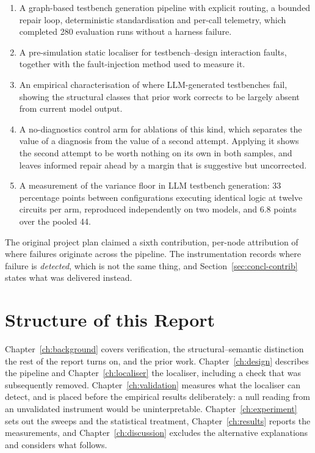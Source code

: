 \documentclass[11pt,a4paper,titlepage=false]{scrreprt}
\begin{document}
\begin{enumerate}
\setlength{\itemsep}{1pt}
\item A graph-based testbench generation pipeline with explicit routing, a bounded repair
loop, deterministic standardisation and per-call telemetry, which completed 280 evaluation
runs without a harness failure.
\item A pre-simulation static localiser for testbench--design interaction faults, together
with the fault-injection method used to measure it.
\item An empirical characterisation of where LLM-generated testbenches fail, showing the
structural classes that prior work corrects to be largely absent from current model output.
\item A no-diagnostics control arm for ablations of this kind, which separates the value of
a diagnosis from the value of a second attempt. Applying it shows the second attempt to be
worth nothing on its own in both samples, and leaves informed repair ahead by a margin that is
suggestive but uncorrected.
\item A measurement of the variance floor in LLM testbench generation: 33 percentage points
between configurations executing identical logic at twelve circuits per arm, reproduced
independently on two models, and 6.8 points over the pooled 44.
\end{enumerate}

The original project plan claimed a sixth contribution, per-node attribution of where
failures originate across the pipeline. The instrumentation records where failure is
\emph{detected}, which is not the same thing, and Section~\ref{sec:concl-contrib} states
what was delivered instead.

\section{Structure of this Report}\label{sec:intro-roadmap}

Chapter~\ref{ch:background} covers verification, the structural--semantic distinction the
rest of the report turns on, and the prior work. Chapter~\ref{ch:design} describes the
pipeline and Chapter~\ref{ch:localiser} the localiser, including a check that was
subsequently removed. Chapter~\ref{ch:validation} measures what the localiser can detect,
and is placed before the empirical results deliberately: a null reading from an unvalidated
instrument would be uninterpretable. Chapter~\ref{ch:experiment} sets out the sweeps and the
statistical treatment, Chapter~\ref{ch:results} reports the measurements, and
Chapter~\ref{ch:discussion} excludes the alternative explanations and considers what
follows.
\end{document}
